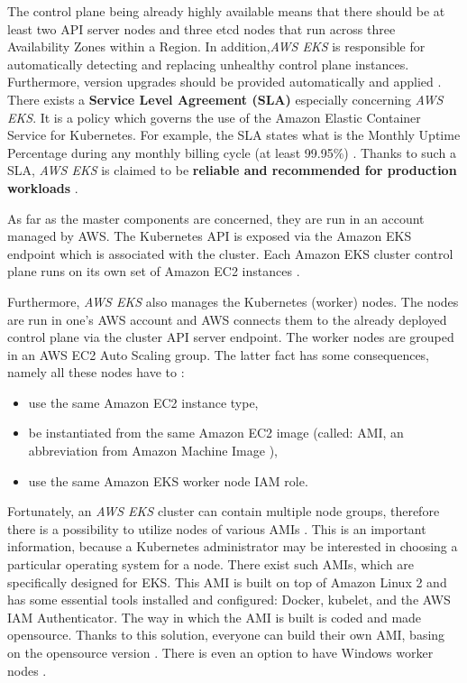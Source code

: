 The control plane being already highly available means that there should be at least two API server nodes and three etcd nodes that run across three Availability Zones within a Region. In addition,\textit{AWS EKS} is responsible for automatically detecting and replacing unhealthy control plane instances. Furthermore, version upgrades should be provided automatically and applied \cite{what-is-eks}. There exists a \textbf{Service Level Agreement (SLA)} especially concerning \textit{AWS EKS}. It is a policy which governs the use of the Amazon Elastic Container Service for Kubernetes. For example, the SLA states what is the Monthly Uptime Percentage during any monthly billing cycle (at least 99.95\%) \cite{eks-sla}. Thanks to such a SLA, \textit{AWS EKS} is claimed to be \textbf{reliable and recommended for production workloads} \cite{what-is-eks}.

As far as the master components are concerned, they are run in an account managed by AWS. The Kubernetes API is exposed via the Amazon EKS endpoint which is associated with the cluster. Each Amazon EKS cluster control plane runs on its own set of Amazon EC2 instances \cite{eks-clusters}.

Furthermore, \textit{AWS EKS} also manages the Kubernetes (worker) nodes. The nodes are run in one's AWS account and AWS connects them to the already deployed control plane via the cluster API server endpoint. The worker nodes are grouped in an AWS EC2 Auto Scaling group. The latter fact has some consequences, namely all these nodes have to \cite{eks-worker}:
\begin{itemize}
\item use the same Amazon EC2 instance type,
\item be instantiated from the same Amazon EC2 image (called: AMI, an abbreviation from Amazon Machine Image \cite{aws-ami}),
\item use the same Amazon EKS worker node IAM role.
\end{itemize}

Fortunately, an \textit{AWS EKS} cluster can contain multiple node groups, therefore there is a possibility to utilize nodes of various AMIs  \cite{eks-worker}. This is an important information, because a Kubernetes administrator may be interested in choosing a particular operating system for a node. There exist such AMIs, which are specifically designed for EKS. This AMI is built on top of Amazon Linux 2 and has some essential tools installed and configured: Docker, kubelet, and the AWS IAM Authenticator. The way in which the AMI is built is coded and made opensource. Thanks to this solution, everyone can build their own AMI, basing on the opensource version  \cite{eks-optimized-ami}. There is even an option to have Windows worker nodes \cite{eks-worker-win}.

